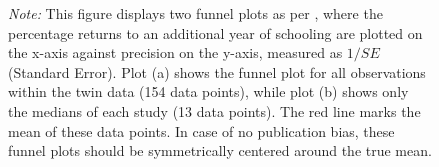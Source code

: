 \begin{figure}[!htbp]
\begin{center}
\begin{subfigure}[b]{0.45\textwidth}
      \label{fig:funnel_plot_twins_medians}
    \end{subfigure}
  \end{center}\vspace{-0.6cm}
  \captionsetup{width=0.85\textwidth, font = scriptsize}
  \caption*{\emph{Note:} This figure displays two funnel plots as per \cite{Egger1997}, where the percentage returns to an additional year of schooling are plotted on the x-axis against precision on the y-axis, measured as $1/SE$ (Standard Error). Plot (a) shows the funnel plot for all observations within the twin data (154 data points), while plot (b) shows only the medians of each study (13 data points). The red line marks the mean of these data points. In case of no publication bias, these funnel plots should be symmetrically centered around the true mean.}
\end{figure}



